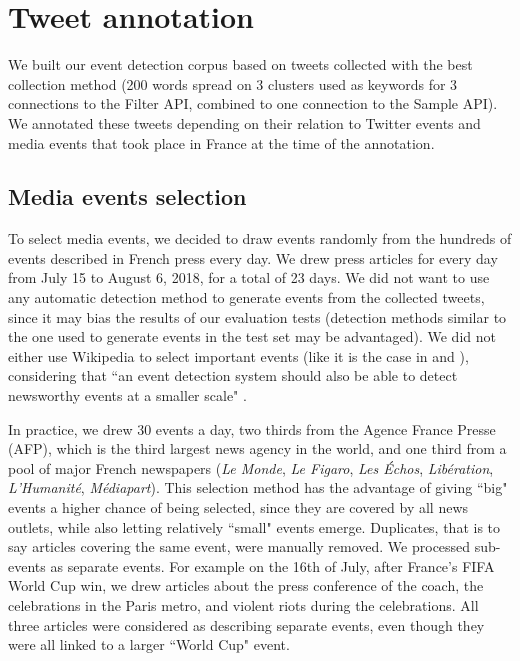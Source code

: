 \section{Tweet annotation}

We built our event detection corpus based on tweets collected with the best collection method (200 words spread on 3 clusters used as keywords for 3 connections to the Filter API, combined to one connection to the Sample API). We annotated these tweets depending on their relation to  Twitter events and media events that took place in France at the time of the annotation.
	
	\subsection{Media events selection}
	To select media events, we decided to draw events randomly
from the hundreds of events described in French press every day. We drew press articles for every day from July 15 to August 6, 2018, for a total of 23 days. We did not want to use any automatic detection method to generate events from the collected tweets, since it may bias the results of our evaluation tests (detection methods similar to the one used to generate events in the test set may be advantaged). We did not either use Wikipedia to select important events (like it is the case in \citet{mcminn_building_2013} and \citet{petrovic_using_2012}), considering that ``an event detection system should also be able to detect newsworthy events at a smaller scale" \citep{hasan_survey_2018}. 


In practice, we drew 30 events a day, two thirds from the Agence France Presse (AFP), which is the third largest news agency in the world, and one third from a pool of major French  newspapers (\textit{Le Monde}, \textit{Le Figaro}, \textit{Les Échos}, \textit{Libération}, \textit{L'Humanité}, \textit{Médiapart}). This selection method has the advantage of giving ``big" events a higher chance of being selected, since they are covered by all news outlets, while also letting relatively ``small" events emerge. Duplicates, that is to say articles covering the same event, were manually removed. We processed sub-events as separate events. For example on the 16th of July, after France's FIFA World Cup win, we drew articles about the press conference of the coach, the celebrations in the Paris metro, and violent riots during the celebrations. All three articles were considered as describing separate events, even though they were all linked to a larger ``World Cup" event.


